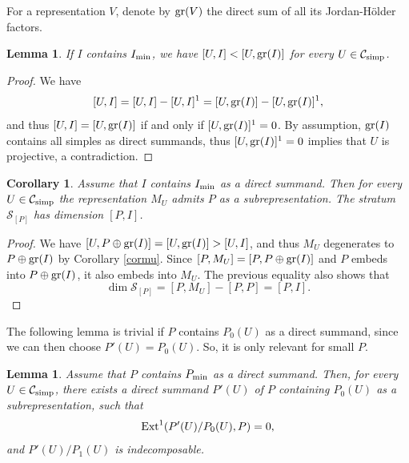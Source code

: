 \documentclass{amsart}
\numberwithin{equation}{section}
\newtheorem{lem}[thm]{Lemma}
\newtheorem{cor}[thm]{Corollary}
\theoremstyle{remark}
\begin{document}
For a representation $V$, denote by ${\rm gr}(V)$ the direct sum of all its Jordan-Hölder factors.

\begin{lem} If $I$ contains $I_{\rm min}$, we have $[U,I]<[U,{\rm gr}(I)]$ for every 
$U\in\mathcal{C}_{\rm simp}$.
\end{lem}

\begin{proof} We have
$$[U,I]=[U,I]-[U,I]^1=[U,{\rm gr}(I)]-[U,{\rm gr}(I)]^1,$$
and thus $[U,I]=[U,{\rm gr}(I)]$ if and only if $[U,{\rm gr}(I)]^1=0$. By assumption, 
${\rm gr}(I)$ contains all simples as direct summands, thus $[U,{\rm gr}(I)]^1=0$ implies 
that $U$ is projective, a contradiction.
\end{proof}

\begin{cor}\label{cors1} Assume that $I$ contains $I_{\rm min}$ as a direct summand. 
Then for every $U\in\mathcal{C}_{\rm simp}$ the representation $M_U$ admits $P$ as a subrepresentation. 
The stratum $\mathcal{S}_{[P]}$ has dimension $[P,I]$.\end{cor}

\begin{proof} 
We have $[U,P\oplus {\rm gr}(I)]=[U,{\rm gr}(I)]>[U,I]$, and thus $M_U$ 
degenerates to $P\oplus{\rm gr}(I)$ by Corollary \ref{cormu}. Since $[P,M_U]=[P,P\oplus {\rm gr}(I)]$ 
and $P$ embeds into $P\oplus {\rm gr}(I)$, it also embeds into $M_U$.  The previous equality also shows that
$$\dim\mathcal{S}_{[P]}=[P,M_U]-[P,P]=[P,I].$$
\end{proof}

The following lemma is trivial if $P$  contains $P_0(U)$ as a direct summand, since we can then choose $P'(U)=P_0(U)$. So, it is only relevant for small $P$.

\begin{lem} Assume that $P$ contains $P_{\rm min}$ as a direct summand. Then, for every $U\in\mathcal{C}_{\rm simp}$, there exists a direct summand $P'(U)$ of $P$ containing $P_0(U)$ as a subrepresentation, 
such that $${\rm Ext}^1(P'(U)/P_0(U),P)=0,$$
and $P'(U)/P_1(U)$ is indecomposable.
\end{lem}
\end{document}

